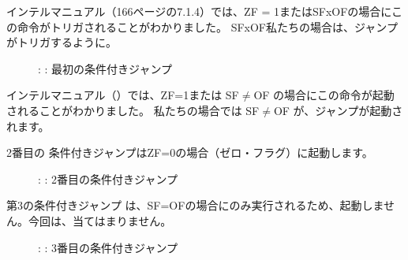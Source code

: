 インテルマニュアル（166ページの7.1.4）では、ZF = 1またはSFxOFの場合にこの命令がトリガされることがわかりました。 SFxOF私たちの場合は、ジャンプがトリガするように。

\begin{figure}[H]
\centering
{}
\caption{\olly: : 最初の条件付きジャンプ}
\label{fig:jcc_olly_signed_1}
\end{figure}

インテルマニュアル（）では、ZF=1または SF$\neq$OF の場合にこの命令が起動されることがわかりました。 
私たちの場合では SF$\neq$OF が、ジャンプが起動されます。

\clearpage
2番目の \JNZ 条件付きジャンプはZF=0の場合（ゼロ・フラグ）に起動します。

\begin{figure}[H]
\centering
{}
\caption{\olly: : 2番目の条件付きジャンプ}
\label{fig:jcc_olly_signed_2}
\end{figure}

\clearpage
第3の条件付きジャンプ \JGE は、SF=OFの場合にのみ実行されるため、起動しません。今回は、当てはまりません。

\begin{figure}[H]
\centering
{}
\caption{\olly: : 3番目の条件付きジャンプ}
\label{fig:jcc_olly_signed_3}
\end{figure}
